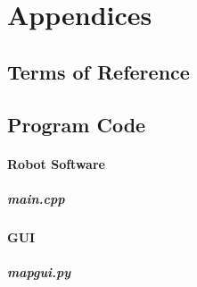 \part{Appendices}
	\begin{appendices}
	\chapter{Terms of Reference}
	
	\chapter{Program Code}
		\subsection{Robot Software}
			\subsubsection{main.cpp}
			
		\subsection{GUI}
			\subsubsection{mapgui.py}
			

\end{appendices}
